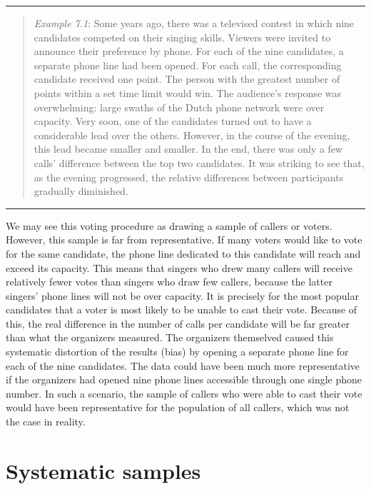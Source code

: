 \documentclass[
]{book}
\begin{document}
\begin{center}\rule{0.5\linewidth}{0.5pt}\end{center}

\begin{quote}
\emph{Example 7.1}: Some years ago, there was a televised contest in which nine candidates competed on their singing skills. Viewers were invited to announce their preference by phone. For each of the nine candidates, a separate phone line had been opened. For each call, the corresponding candidate received one point. The person with the greatest number of points within a set time limit would win. The audience's response was overwhelming: large swaths of the Dutch phone network were over capacity. Very soon, one of the candidates turned out to have a considerable lead over the others. However, in the course of the evening, this lead became smaller and smaller. In the end, there was only a few calls' difference between the top two candidates. It was striking to see that, as the evening progressed, the relative differences between participants gradually diminished.
\end{quote}

\begin{center}\rule{0.5\linewidth}{0.5pt}\end{center}

We may see this voting procedure as drawing a sample of callers or voters. However, this sample is far from representative. If many voters would like to vote for the same candidate, the phone line dedicated to this candidate will reach and exceed its capacity. This means that singers who drew many callers will receive relatively fewer votes than singers who draw few callers, because the latter singers' phone lines will not be over capacity. It is precisely for the most popular candidates that a voter is most likely to be unable to cast their vote. Because of this, the real difference in the number of calls per candidate will be far greater than what the organizers measured. The organizers themselved caused this systematic distortion of the results (bias) by opening a separate phone line for each of the nine candidates. The data could have been much more representative if the organizers had opened nine phone lines accessible through one single phone number. In such a scenario, the sample of callers who were able to cast their vote would have been representative for the population of all callers, which was not the case in reality.

\hypertarget{sec:systematic-samples}{%
\section{Systematic samples}\label{sec:systematic-samples}}
\end{document}
